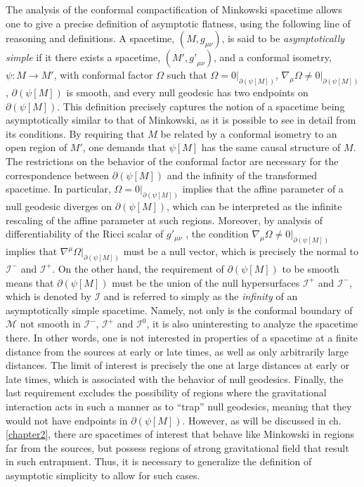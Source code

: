 \documentclass[
12pt,		%
openright,	%
twoside,  %
a4paper,			%
chapter=TITLE,		%
english,			%
french,				%
spanish,			%
brazil				%
]{USPSC-classe/USPSC}
\begin{document}
The analysis of the conformal compactification of Minkowski spacetime allows one to give a precise definition of asymptotic flatness, using the following line of reasoning and definitions. A spacetime, $(M,g_{\mu\nu})$, is said to be \textit{asymptotically simple} if it there exists a spacetime, $(M',{g'}_{\mu\nu})$, and a conformal isometry, $\psi:M\to{M'}$, with conformal factor $\Omega$ such that $\Omega=0|_{\partial(\psi[M])}$, $\nabla_{\mu}\Omega\neq0|_{\partial(\psi[M])}$, $\partial(\psi[M])$ is smooth, and every null geodesic has two endpoints on $\partial(\psi[M])$. This definition precisely captures the notion of a spacetime being asymptotically similar to that of Minkowski, as it is possible to see in detail from its conditions. By requiring that $M$ be related by a conformal isometry to an open region of $M'$, one demands that $\psi[M]$ has the same causal structure of $M$. The restrictions on the behavior of the conformal factor are necessary for the correspondence between $\partial(\psi[M])$ and the infinity of the transformed spacetime. In particular, $\Omega=0|_{\partial(\psi[M])}$ implies that the affine parameter of a null geodesic diverges on $\partial(\psi[M])$, which can be interpreted as the infinite rescaling of the affine parameter at such regions. Moreover, by analysis of differentiability of the Ricci scalar of $g'_{\mu\nu}$ \cite{Hawking1973}, the condition $\nabla_{\mu}\Omega\neq0|_{\partial(\psi[M])}$ implies that $\nabla^{\mu}\Omega|_{\partial(\psi[M])}$ must be a null vector, which is precisely the normal to $\mathscr{I}^-$ and $\mathscr{I}^+$. On the other hand, the requirement of $\partial(\psi[M])$ to be smooth means that $\partial(\psi[M])$ must be the union of the null hypersurfaces $\mathscr{I}^+$ and $\mathscr{I}^-$, which is denoted by $\mathscr{I}$ and is referred to simply as the \textit{infinity} of an asymptotically simple spacetime. Namely, not only is the conformal boundary of $\mathcal{M}$ not smooth in $\mathcal{I}^-$, $\mathcal{I}^+$ and $\mathcal{I}^0$, it is also uninteresting to analyze the spacetime there. In other words, one is not interested in properties of a spacetime at a finite distance from the sources at early or late times, as well as only arbitrarily large distances. The limit of interest is precisely the one at large distances at early or late times, which is associated with the behavior of null geodesics. Finally, the last requirement excludes the possibility of regions where the gravitational interaction acts in such a manner as to “trap” null geodesics, meaning that they would not have endpoints in $\partial(\psi[M])$. However, as will be discussed in ch. \ref{chapter2}, there are spacetimes of interest that behave like Minkowski in regions far from the sources, but possess regions of strong gravitational field that result in such entrapment. Thus, it is necessary to generalize the definition of asymptotic simplicity to allow for such cases. 
\end{document}
